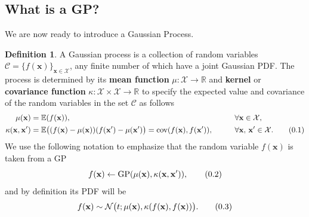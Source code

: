 \documentclass[10pt]{article}
\theoremstyle{definition}
\newtheorem{defn}{Definition}[section]
\theoremstyle{definition}
\theoremstyle{remark}
\newcommand\eqnum{\addtocounter{equation}{1}\tag{\arabic{section}.\arabic{equation}}}
\DeclareMathOperator{\cov}{cov}
\DeclareMathOperator{\gp}{GP}
\begin{document}
\subsection{What is a GP?}
We are now ready to introduce a Gaussian Process.
\begin{defn}
A Gaussian process is a collection of random variables $\mathscr{C} = \{f(\mathbf{x})\}_{\mathbf{x}\in\mathcal{X}}$, any finite number of which have a joint Gaussian PDF. The process is determined by its \textbf{mean function} $\mu: \mathcal{X} \to \mathbb{R}$ and \textbf{kernel} or \textbf{covariance function} $\kappa: \mathcal{X} \times\mathcal{X} \to \mathbb{R}$ to specify the expected value and covariance of the random variables in the set $\mathscr{C}$ as follows
\begin{alignat*}{2}
\mu(\mathbf{x}) &= \mathbb{E}(f(\mathbf{x})), && \forall \mathbf{x}\in\mathcal{X}, \\
\kappa(\mathbf{x},\mathbf{x}') &= \mathbb{E}\big((f(\mathbf{x})-\mu(\mathbf{x}))(f(\mathbf{x}')-\mu(\mathbf{x}')\big) = \cov(f(\mathbf{x}), f(\mathbf{x}')), \qquad && \forall \mathbf{x},\, \mathbf{x}'\in\mathcal{X}.
\eqnum
\label{eq:GP:def}
\end{alignat*}
We use the following notation to emphasize that the random variable $f(\mathbf{x})$ is taken from a GP
\begin{equation*}
f(\mathbf{x}) \leftarrow \gp(\mu(\mathbf{x}), \kappa(\mathbf{x},\mathbf{x}')),
\eqnum
\end{equation*}
and by definition its PDF will be
\begin{equation*}
f(\mathbf{x}) \sim \mathcal{N}\big(t; \mu(\mathbf{x}), \kappa(f(\mathbf{x}), f(\mathbf{x}))\big).
\eqnum
\end{equation*}
\end{defn}
\end{document}
